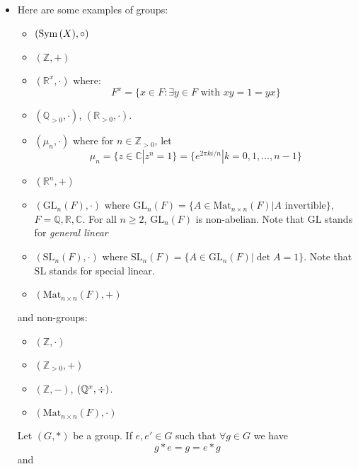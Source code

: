 \begin{itemize}
    \item Here are some examples of groups:
    \begin{itemize}
        \item $(\mathrm{Sym}\,(X), \circ)$
        \item $(\mathbb{Z}, +)$
        \item $(\mathbb{R}^x, \cdot)$ where:
        \begin{equation}
            F^x = \{x\in F: \exists y\in F \text{ with } xy=1=yx\} 
        \end{equation}
        \item $(\mathbb{Q}_{>0}, \cdot)$, $(\mathbb{R}_{>0}, \cdot)$.
        \item $(\mu_n, \cdot)$ where for $n \in \mathbb{Z}_{>0}$, let \begin{equation}
            \mu_n = \{z \in \mathbb{C} | z^n = 1\} = \{e^{2\pi k i/n} | k = 0,1,\dots,n-1\}
        \end{equation}
        \item $(\mathbb{R}^n, +)$
        \item $(\text{GL}_n(F), \cdot)$ where $\text{GL}_n(F) = \{A\in \text{Mat}_{n\times n}(F) | A\text{ invertible}\}$, $F=\mathbb{Q},\mathbb{R}, \mathbb{C}$.
        For all $n\ge 2$, $\text{GL}_n(F)$ is non-abelian. Note that $\text{GL}$ stands for \textit{general linear}
        \item $(\text{SL}_n(F), \cdot)$ where $\text{SL}_n(F) = \{A \in \text{GL}_n(F) | \det A = 1\}$.
        Note that $\text{SL}$ stands for special linear.
        \item $(\text{Mat}_{n\times n}(F), +)$
    \end{itemize}
    and non-groups:
    \begin{itemize}
        \item $(\mathbb{Z}, \cdot)$
        \item $(\mathbb{Z}_{> 0}, +)$
        \item $(\mathbb{Z}, -)$, $(\mathbb{Q}^x, \divisionsymbol)$.
        \item $(\text{Mat}_{n\times n}(F), \cdot)$
    \end{itemize}
    \begin{proposition}
        Let $(G,*)$ be a group. If $e, e' \in G$ such that $\forall g\in G$ we have
        \begin{equation}
            g*e = g = e*g
            \label{eq:prop1a}
        \end{equation}
        and
        \begin{equation}

\end{equation}
\end{proposition}
\end{itemize}
